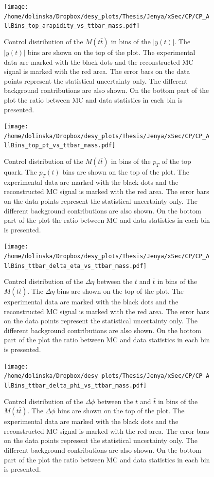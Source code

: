 \begin{figure}[p]
  \centering
  \texttt{[image: /home/dolinska/Dropbox/desy\_plots/Thesis/Jenya/xSec/CP/CP\_AllBins\_top\_arapidity\_vs\_ttbar\_mass.pdf]}
  \caption{Control distribution of the $M(t\bar{t})$ in bins of the $|y(t)|$. The $|y(t)|$ bins are shown on the top 
  of the plot. The experimental data are marked with the black dots and the reconstructed MC signal is marked with the red area. The error
  bars on the data points represent the statistical uncertainty only. The 
  different background contributions are also shown. On the bottom part of the plot the ratio between MC and data statistics in each bin
  is presented.}
  \label{fig:CP_2D_Mtt_y}
\end{figure}

\begin{figure}[p]
  \centering
  \texttt{[image: /home/dolinska/Dropbox/desy\_plots/Thesis/Jenya/xSec/CP/CP\_AllBins\_top\_pt\_vs\_ttbar\_mass.pdf]}
  \caption{Control distribution of the $M(t\bar{t})$ in bins of the $p_{T}$ of the top quark. The $p_{T}(t)$ bins are shown on the top 
  of the plot. The experimental data are marked with the black dots and the reconstructed MC signal is marked with the red area. The error
  bars on the data points represent the statistical uncertainty only. The 
  different background contributions are also shown. On the bottom part of the plot the ratio between MC and data statistics in each bin
  is presented.}
  \label{fig:CP_2D_Mtt_pt}
\end{figure}

\begin{figure}[p]
  \centering
  \texttt{[image: /home/dolinska/Dropbox/desy\_plots/Thesis/Jenya/xSec/CP/CP\_AllBins\_ttbar\_delta\_eta\_vs\_ttbar\_mass.pdf]}
  \caption{Control distribution of the $\Delta\eta$ between the $t$ and $\bar{t}$ in bins of the $M(t\bar{t})$. The $\Delta\eta$ bins are shown on the top 
  of the plot. The experimental data are marked with the black dots and the reconstructed MC signal is marked with the red area. The error
  bars on the data points represent the statistical uncertainty only. The 
  different background contributions are also shown. On the bottom part of the plot the ratio between MC and data statistics in each bin
  is presented.}
  \label{fig:CP_2D_eta_Mtt}
\end{figure}

\begin{figure}[p]
  \centering
  \texttt{[image: /home/dolinska/Dropbox/desy\_plots/Thesis/Jenya/xSec/CP/CP\_AllBins\_ttbar\_delta\_phi\_vs\_ttbar\_mass.pdf]}
  \caption{Control distribution of the $\Delta\phi$ between the $t$ and $\bar{t}$ in bins of the $M(t\bar{t})$. The $\Delta\phi$ bins are shown on the top 
  of the plot. The experimental data are marked with the black dots and the reconstructed MC signal is marked with the red area. The error
  bars on the data points represent the statistical uncertainty only. The 
  different background contributions are also shown. On the bottom part of the plot the ratio between MC and data statistics in each bin
  is presented.}
  \label{fig:CP_2D_phi_Mtt}
\end{figure}

